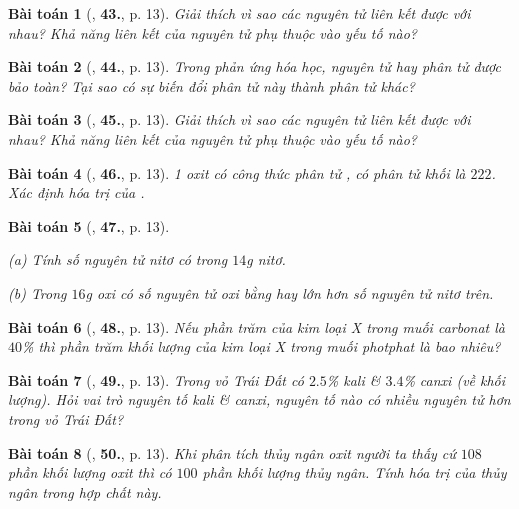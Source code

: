 \documentclass{article}
\numberwithin{equation}{section}
\newtheorem{baitoan}{Bài toán}[section]
\begin{document}
\begin{baitoan}[\cite{An2011}, \textbf{43.}, p. 13]
	Giải thích vì sao các nguyên tử liên kết được với nhau? Khả năng liên kết của nguyên tử phụ thuộc vào yếu tố nào?
\end{baitoan}

\begin{baitoan}[\cite{An2011}, \textbf{44.}, p. 13]
	Trong phản ứng hóa học, nguyên tử hay phân tử được bảo toàn? Tại sao có sự biến đổi phân tử này thành phân tử khác?
\end{baitoan}

\begin{baitoan}[\cite{An2011}, \textbf{45.}, p. 13]
	Giải thích vì sao các nguyên tử liên kết được với nhau? Khả năng liên kết của nguyên tử phụ thuộc vào yếu tố nào?
\end{baitoan}

\begin{baitoan}[\cite{An2011}, \textbf{46.}, p. 13]
	1 oxit có công thức phân tử , có phân tử khối là $222$. Xác định hóa trị của .
\end{baitoan}

\begin{baitoan}[\cite{An2011}, \textbf{47.}, p. 13]
	\begin{enumerate*}
		\item[(a)] Tính số nguyên tử nitơ có trong $14$g nitơ.
		\item[(b)] Trong $16$g oxi có số nguyên tử oxi bằng hay lớn hơn số nguyên tử nitơ trên.
	\end{enumerate*}
\end{baitoan}

\begin{baitoan}[\cite{An2011}, \textbf{48.}, p. 13]
	Nếu phần trăm của kim loại X trong muối carbonat là $40$\% thì phần trăm khối lượng của kim loại X trong muối photphat là bao nhiêu?
\end{baitoan}

\begin{baitoan}[\cite{An2011}, \textbf{49.}, p. 13]
	Trong vỏ Trái Đất có $2.5$\% kali \& $3.4$\% canxi (về khối lượng). Hỏi vai trò nguyên tố kali \& canxi, nguyên tố nào có nhiều nguyên tử hơn trong vỏ Trái Đất?
\end{baitoan}

\begin{baitoan}[\cite{An2011}, \textbf{50.}, p. 13]
	Khi phân tích thủy ngân oxit người ta thấy cứ $108$ phần khối lượng oxit thì có $100$ phần khối lượng thủy ngân. Tính hóa trị của thủy ngân trong hợp chất này.
\end{baitoan}
\end{document}
